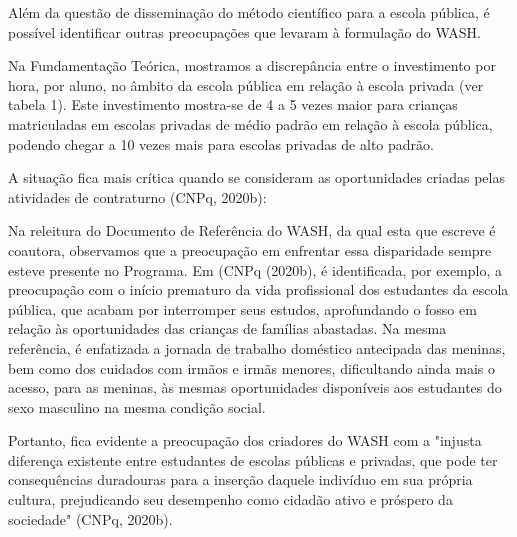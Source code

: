 Além da questão de disseminação do método científico para a escola pública, é possível identificar outras preocupações que levaram à formulação do WASH.

Na Fundamentação Teórica, mostramos a discrepância entre o investimento por hora, por aluno, no âmbito da escola pública em relação à escola privada (ver tabela 1). Este investimento mostra-se de 4 a 5 vezes maior para crianças matriculadas em escolas privadas de médio padrão em relação à escola pública, podendo chegar a 10 vezes mais para escolas privadas de alto padrão.

A situação fica mais crítica quando se consideram as oportunidades criadas pelas atividades de contraturno (CNPq, 2020b):


\noindent\begin{flushright}\mbox{\linespread{1}\selectfont\centering{}}\end{flushright}


Na releitura do Documento de Referência do WASH, da qual esta que escreve é coautora, observamos que a preocupação em enfrentar essa disparidade sempre esteve presente no Programa. Em  (CNPq (2020b), é identificada, por exemplo, a preocupação com o início prematuro da vida profissional dos estudantes da escola pública, que acabam por interromper seus estudos, aprofundando o fosso em relação às oportunidades das crianças de famílias abastadas. Na mesma referência, é enfatizada a jornada de trabalho doméstico antecipada  das meninas, bem como dos cuidados com irmãos e irmãs menores, dificultando ainda mais o acesso, para as meninas, às mesmas oportunidades disponíveis aos estudantes do sexo masculino na mesma condição social.

Portanto, fica evidente a preocupação dos criadores do WASH com a "injusta diferença existente entre estudantes de escolas públicas e privadas, que pode ter consequências duradouras para a inserção daquele indivíduo em sua própria cultura, prejudicando seu desempenho como cidadão ativo e próspero da sociedade" (CNPq, 2020b).


